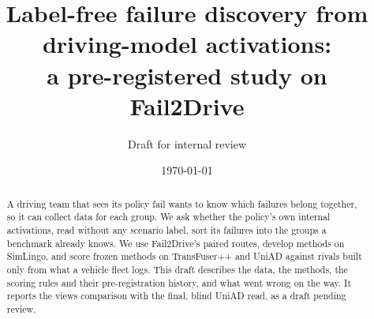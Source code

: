 \documentclass[11pt]{article}
\title{Label-free failure discovery from driving-model activations:\\
a pre-registered study on Fail2Drive}
\author{Draft for internal review}
\date{\today}
\begin{document}
\maketitle

\begin{abstract}
A driving team that sees its policy fail wants to know which failures belong
together, so it can collect data for each group. We ask whether the policy's own
internal activations, read without any scenario label, sort its failures into the
groups a benchmark already knows. We use Fail2Drive's paired routes, develop
methods on SimLingo, and score frozen methods on TransFuser++ and UniAD against
rivals built only from what a vehicle fleet logs. This draft describes the data,
the methods, the scoring rules and their pre-registration history, and what went
wrong on the way. It reports the views comparison with the final, blind UniAD
read, as a draft pending review.
\end{abstract}










\appendix




\end{document}
